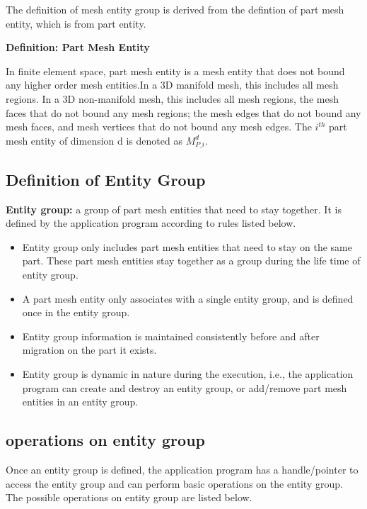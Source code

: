 
The definition of mesh entity group is derived from the defintion of
part mesh entity, which is from part entity. 


\textbf{Definition: Part Mesh Entity}

In finite element space, part mesh entity is a mesh entity that does not
bound any higher order mesh entities.In a 3D manifold
mesh, this includes all mesh regions. In a 3D non-manifold mesh, this
includes all mesh regions, the mesh faces that do not bound any mesh
regions; the mesh edges that do not bound any mesh faces, and mesh
vertices that do not bound any mesh edges. The $i^{th}$ part mesh entity of
dimension d is denoted as $M^d_{P\_i}$.


\subsection{Definition of Entity Group}

\textbf{Entity group:} a group of part mesh entities that
need to stay together. It is defined by the application program
according to rules listed below. 

\begin{itemize}
\item Entity group only includes part mesh entities that need to stay
  on the same part. These part mesh entities stay together as a group
  during the life time of entity group.

\item A part mesh entity only associates with a single entity group, and is defined once in the entity group.

\item Entity group information is maintained consistently before and
  after migration on the part it exists.

\item Entity group is dynamic in nature during the execution, i.e.,
  the application program can create and destroy an entity group, or
  add/remove  part mesh entities in an entity group. 
\end{itemize}

\subsection{operations on entity group} 
Once an entity group is defined, the application program has a
handle/pointer to access the entity group and can perform basic
operations on the entity group. The possible operations on entity group are listed below. 

